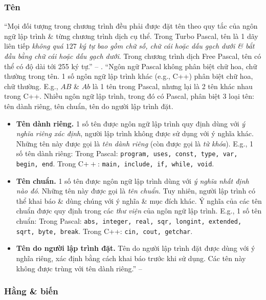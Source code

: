 \documentclass[oneside]{book}
\numberwithin{equation}{section}
\begin{document}
\subsubsection{Tên}
``Mọi đối tượng trong chương trình đều phải được đặt tên theo quy tắc của ngôn ngữ lập trình \& từng chương trình dịch cụ thể. Trong Turbo Pascal, tên là 1 dãy liên tiếp \textit{không quá $127$ ký tự bao gồm chữ số, chữ cái hoặc dấu gạch dưới \& bắt đầu bằng chữ cái hoặc dấu gạch dưới}. Trong chương trình dịch Free Pascal, tên có thể có độ dài tới 255 ký tự.'' -- \cite[p. 10]{SGK_Tin_Hoc_11}. ``Ngôn ngữ Pascal không phân biệt chữ hoa, chữ thường trong tên. 1 số ngôn ngữ lập trình khác (e.g., C++) phân biệt chữ hoa, chữ thường. E.g., $AB$ \& $Ab$ là 1 tên trong Pascal, nhưng lại là 2 tên khác nhau trong C++. Nhiều ngôn ngữ lập trình, trong đó có Pascal, phân biệt 3 loại tên: tên dành riêng, tên chuẩn, tên do người lập trình đặt.
\begin{itemize}
	\item \textbf{Tên dành riêng.} 1 số tên được ngôn ngữ lập trình quy định dùng với \textit{ý nghĩa riêng xác định}, người lập trình không được sử dụng với ý nghĩa khác. Những tên này được gọi là \textit{tên dành riêng} (còn được gọi là \textit{từ khóa}). E.g., 1 số tên dành riêng: Trong Pascal: \texttt{program, uses, const, type, var, begin, end}. Trong C$++$: \texttt{main, include, if, while, void}.
	\item \textbf{Tên chuẩn.} 1 số tên được ngôn ngữ lập trình dùng với \textit{ý nghĩa nhất định nào đó}. Những tên này được gọi là \textit{tên chuẩn}. Tuy nhiên, người lập trình có thể khai báo \& dùng chúng với ý nghĩa \& mục đích khác. Ý nghĩa của các tên chuẩn được quy định trong các \textit{thư viện} của ngôn ngữ lập trình. E.g., 1 số tên chuẩn: Trong Pascal: \texttt{abs, integer, real, sqr, longint, extended, sqrt, byte, break}. Trong C++: \texttt{cin, cout, getchar}.
	\item \textbf{Tên do người lập trình đặt.} Tên do người lập trình đặt được dùng với ý nghĩa riêng, xác định bằng cách khai báo trước khi sử dụng. Các tên này không được trùng với tên dành riêng.'' -- \cite[p. 11]{SGK_Tin_Hoc_11}
\end{itemize}

\subsubsection{Hằng \& biến}
\end{document}
